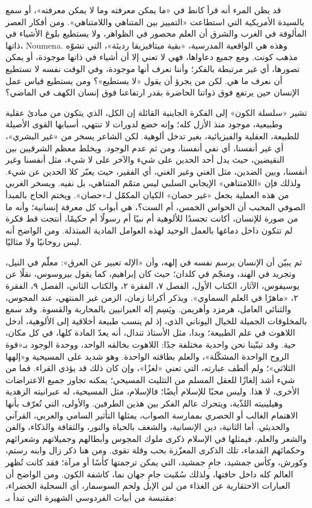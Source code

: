 قد يظن المرء أنه قرأ كانط في «ما يمكن معرفته وما لا يمكن معرفته»، أو سمع بالسيدة الأمريكية التي استطاعت «التمييز بين المتناهي واللامتناهي». ومن أفكار العصر المألوفة في الغرب والشرق أن العلم محصور في الظواهر، ولا يستطيع بلوغ الأشياء في ذاتها، \textenglish{Noumena}. وهذه هي الواقعية المدرسية، «بقية ميتافيزيقا رديئة»، التي تشوّه مذهب كونت. ومع جميع دعاواها، فهي لا تعني إلا أن أشياء في ذاتها موجودة، أو يمكن تصورها، أي غير مرتبطة بالفكر؛ وأننا نعرف أنها موجودة، وفي الوقت نفسه لا نستطيع أن نعرف ما هي. لكن من يجرؤ أن يقول «لا يستطيع»؟ ومن يستطيع قياس عمل الإنسان حين يرتفع فوق ذواتنا الحاضرة بقدر ارتفاعنا فوق إنسان الكهف في الماضي؟

تشير «سلسلة الكون» إلى الفكرة الجاينية القائلة إن الكل، الذي يتكون من مبادئ عقلية وطبيعية، موجود منذ الأزل كله؛ وإنه خضع لدورات لا تنتهي، أسبابها القوى الأصيلة للطبيعة، العقلية والفيزيائية، بغير تدخل ألوهية. لكن الشاعر يسخر من «غير البشري»، أي غير أنفسنا، أي نفي أنفسنا، ومن ثم عدم الوجود. ويخلط معظم الشرقيين بين النقيضين، حيث يدل أحد الحدين على شيء والآخر على لا شيء، مثل أنفسنا وغير أنفسنا، وبين الضدين، مثل الغني وغير الغني، أي الفقير، حيث يعبّر كلا الحدين عن شيء. ولذلك فإن «اللامتناهي» الإيجابي السلبي ليس متمّم المتناهي، بل نفيه. ويسخر الغربي من هذه العملية بجعل «غير حصان» الكيان المكمّل لـ«حصان». ويختم الحاج بالمبدأ الصوفي المحبب أن الحواس الخمس، أم الست؟، هي أبواب كل معرفة إنسانية؛ وأنه ما من صورة للإنسان، أكانت تجسدًا للألوهية أم نبيًا أم رسولًا أم حكيمًا، أنتجت قط فكرة لم تتكون داخل دماغها بالعمل الوحيد لهذه العوامل المادية المبتذلة. ومن الواضح أنه ليس روحانيًا ولا مثاليًا.

ثم يبيّن أن الإنسان يرسم نفسه في إلهه، وأن «الإله تعبير عن العرق»: معلّم في النيل، وتجريد في الهند، ومنجّم في كلدان؛ حيث كان إبراهيم، كما يقول بيروسوس، نقلًا عن يوسيفوس، الآثار، الكتاب الأول، الفصل ٧، الفقرة ٢، والكتاب الثاني، الفصل ٩، الفقرة ٢، «ماهرًا في العلم السماوي». ويذكر أكرانا زمان، الزمن غير المنتهي، عند المجوس، والثنائي العامل، هرمزد وأهريمن. ويَسِم إله العبرانيين بالمحاربة والقسوة. وقد سمع بالمخلوقات الجميلة للخيال اليوناني الذي، إذ لم ينسب طبيعة أخلاقية إلى الألوهية، أدخل اللاهوت في علم الطبيعة؛ وبدا، مثل الأستاذ تندال، أنه يعدّ المادة كلها، في كل مكان، حية. وقد تبنّينا نحن واحدية مختلفة جدًا: اللاهوت بخالقه الواحد، ووحدة الوجود بـ«قوة الروح الواحدة المشكّلة»، والعلم بطاقته الواحدة. وهو شديد على المسيحية و«إلهها الثلاثي»؛ ولم ألطف عبارته، التي تعني «لغزًا»، وإن كان ذلك قد يؤذي القراء. فما من شيء أشد إلغازًا للعقل المسلم من التثليث المسيحي؛ يمكنه تجاوز جميع الاعتراضات الأخرى، لا هذا. وليس محبًا للإسلام أيضًا؛ فالإسلام، مثل المسيحية، له عبرانيته الزهدية وهيلينيته اللذّية، ويتحرك عالم الفكر بين هذين الطرفين. والأولى، التي تُعرّف بأنها الاهتمام الغالب أو الحصري بممارسة الصواب، يمثلها التأثير السامي والعربي، القرآني والحديثي. أما الثانية، دين الإنسانية، والشغف بالحياة والنور، والثقافة والذكاء، والفن والشعر والعلم، فيمثلها في الإسلام ذكرى ملوك المجوس وأبطالهم وجميلاتهم وشعرائهم وحكمائهم القدماء، تلك الذكرى المعزّزة بحب وقلة تقوى. ومن هنا ذكر زال وابنه رستم، وكورش، وكأس جمشيد، جامِ جمشيد، التي يمكن ترجمتها كأسًا أو مرآة؛ فقد كانت تُظهر العالم كله داخل حافتها، ولذلك سُمّيت جامِ جهان نما، كاشفة الكون. ومن الواضح أن العبارات الاحتقارية عن الغذاء من لبن الإبل ولحم السوسمار، أي السحلية الخضراء، مقتبسة من أبيات الفردوسي الشهيرة التي تبدأ بـ:

